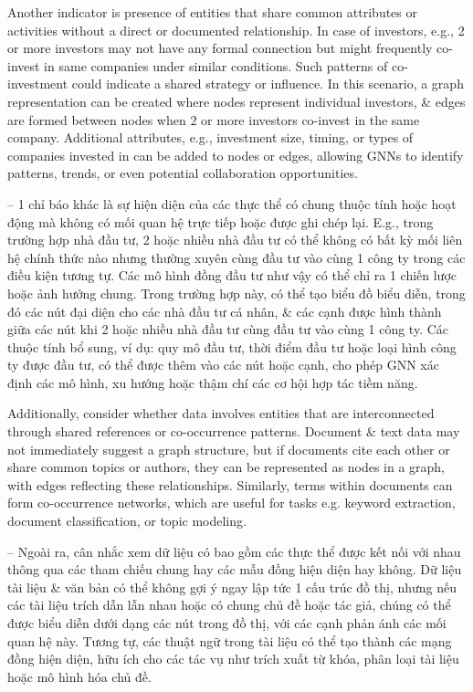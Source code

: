 \documentclass{article}
\begin{document}
\begin{itemize}
\begin{itemize}
\begin{itemize}
            Another indicator is presence of entities that share common attributes or activities without a direct or documented relationship. In case of investors, e.g., 2 or more investors may not have any formal connection but might frequently co-invest in same companies under similar conditions. Such patterns of co-investment could indicate a shared strategy or influence. In this scenario, a graph representation can be created where nodes represent individual investors, \& edges are formed between nodes when 2 or more investors co-invest in the same company. Additional attributes, e.g., investment size, timing, or types of companies invested in can be added to nodes or edges, allowing GNNs to identify patterns, trends, or even potential collaboration opportunities.

            -- 1 chỉ báo khác là sự hiện diện của các thực thể có chung thuộc tính hoặc hoạt động mà không có mối quan hệ trực tiếp hoặc được ghi chép lại. E.g., trong trường hợp nhà đầu tư, 2 hoặc nhiều nhà đầu tư có thể không có bất kỳ mối liên hệ chính thức nào nhưng thường xuyên cùng đầu tư vào cùng 1 công ty trong các điều kiện tương tự. Các mô hình đồng đầu tư như vậy có thể chỉ ra 1 chiến lược hoặc ảnh hưởng chung. Trong trường hợp này, có thể tạo biểu đồ biểu diễn, trong đó các nút đại diện cho các nhà đầu tư cá nhân, \& các cạnh được hình thành giữa các nút khi 2 hoặc nhiều nhà đầu tư cùng đầu tư vào cùng 1 công ty. Các thuộc tính bổ sung, ví dụ: quy mô đầu tư, thời điểm đầu tư hoặc loại hình công ty được đầu tư, có thể được thêm vào các nút hoặc cạnh, cho phép GNN xác định các mô hình, xu hướng hoặc thậm chí các cơ hội hợp tác tiềm năng.

            Additionally, consider whether data involves entities that are interconnected through shared references or co-occurrence patterns. Document \& text data may not immediately suggest a graph structure, but if documents cite each other or share common topics or authors, they can be represented as nodes in a graph, with edges reflecting these relationships. Similarly, terms within documents can form co-occurrence networks, which are useful for tasks e.g. keyword extraction, document classification, or topic modeling.

            -- Ngoài ra, cân nhắc xem dữ liệu có bao gồm các thực thể được kết nối với nhau thông qua các tham chiếu chung hay các mẫu đồng hiện diện hay không. Dữ liệu tài liệu \& văn bản có thể không gợi ý ngay lập tức 1 cấu trúc đồ thị, nhưng nếu các tài liệu trích dẫn lẫn nhau hoặc có chung chủ đề hoặc tác giả, chúng có thể được biểu diễn dưới dạng các nút trong đồ thị, với các cạnh phản ánh các mối quan hệ này. Tương tự, các thuật ngữ trong tài liệu có thể tạo thành các mạng đồng hiện diện, hữu ích cho các tác vụ như trích xuất từ khóa, phân loại tài liệu hoặc mô hình hóa chủ đề.


\end{itemize}
\end{itemize}
\end{itemize}
\end{document}
